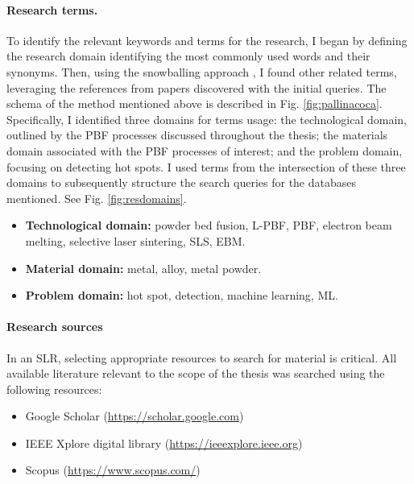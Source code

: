 \paragraph{Research terms.}
To identify the relevant keywords and terms for the research, I began by defining the research domain identifying the most commonly used words and their synonyms. Then, using the snowballing approach \cite{wohlin_guidelines_2014}, I found other related terms, leveraging the references from papers discovered with the initial queries. The schema of the method mentioned above is described in Fig. \ref{fig:pallinacoca}. Specifically, I identified three domains for terms usage: the technological domain, outlined by the PBF processes discussed throughout the thesis; the materials domain associated with the PBF processes of interest; and the problem domain, focusing on detecting hot spots. I used terms from the intersection of these three domains to subsequently structure the search queries for the databases mentioned. See Fig. \ref{fig:resdomains}.
\begin{itemize}
    \item \textbf{Technological domain:} powder bed fusion, L-PBF, PBF, electron beam melting, selective laser sintering, SLS, EBM.
    \item \textbf{Material domain:} metal, alloy, metal powder.
    \item \textbf{Problem domain:} hot spot, detection, machine learning, ML.
\end{itemize}

\paragraph{Research sources} In an SLR, selecting appropriate resources to search for material is critical. All available literature relevant to the scope of the thesis was searched using the following resources:
\begin{itemize}
    \item Google Scholar (\href{https://scholar.google.com}{https://scholar.google.com})
    \item IEEE Xplore digital library (\href{https://ieeexplore.ieee.org}{https://ieeexplore.ieee.org})
    \item Scopus (\href{https://www.scopus.com/}{https://www.scopus.com/})
\end{itemize}

